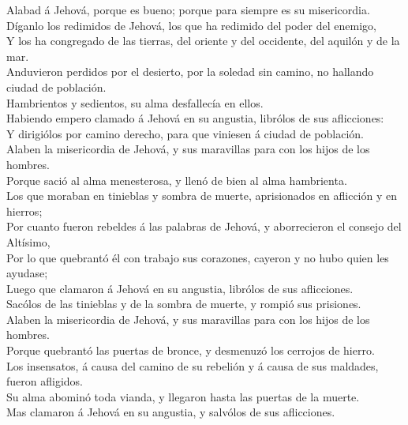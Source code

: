  Alabad á Jehová, porque es bueno; porque para siempre es
su misericordia.\\
 Díganlo los redimidos de Jehová, los que ha redimido del
poder del enemigo,\\
 Y los ha congregado de las tierras, del oriente y del
occidente, del aquilón y de la mar.\\
 Anduvieron perdidos por el desierto, por la soledad sin
camino, no hallando ciudad de población.\\
 Hambrientos y sedientos, su alma desfallecía en ellos.\\
 Habiendo empero clamado á Jehová en su angustia, librólos
de sus aflicciones:\\
 Y dirigiólos por camino derecho, para que viniesen á
ciudad de población.\\
 Alaben la misericordia de Jehová, y sus maravillas para
con los hijos de los hombres.\\
 Porque sació al alma menesterosa, y llenó de bien al alma
hambrienta.\\
 Los que moraban en tinieblas y sombra de muerte,
aprisionados en aflicción y en hierros;\\
 Por cuanto fueron rebeldes á las palabras de Jehová, y
aborrecieron el consejo del Altísimo,\\
 Por lo que quebrantó él con trabajo sus corazones,
cayeron y no hubo quien les ayudase;\\
 Luego que clamaron á Jehová en su angustia, librólos de
sus aflicciones.\\
 Sacólos de las tinieblas y de la sombra de muerte, y
rompió sus prisiones.\\
 Alaben la misericordia de Jehová, y sus maravillas para
con los hijos de los hombres.\\
 Porque quebrantó las puertas de bronce, y desmenuzó los
cerrojos de hierro.\\
 Los insensatos, á causa del camino de su rebelión y á
causa de sus maldades, fueron afligidos.\\
 Su alma abominó toda vianda, y llegaron hasta las
puertas de la muerte.\\
 Mas clamaron á Jehová en su angustia, y salvólos de sus
aflicciones.\\
